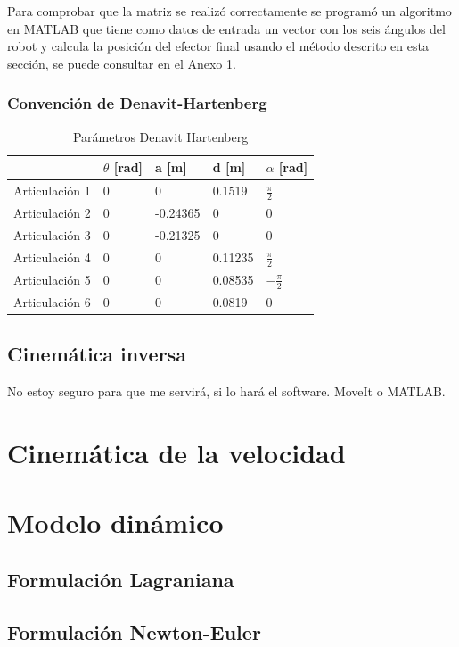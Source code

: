 Para comprobar que la matriz se realizó correctamente se programó un algoritmo en MATLAB que tiene como datos de entrada un vector con los seis ángulos del robot y calcula la posición del efector final usando el método descrito en esta sección, se puede consultar en el Anexo 1.

\subsubsection{Convención de Denavit-Hartenberg}


\begin{table}[h]
\centering
\caption{Parámetros Denavit Hartenberg}
 \label{table:denavithartenberg}
\begin{tabular}{l|l|l|l|l|}
               & $\theta$ [rad] & a [m]    & d [m]   & $\alpha$ [rad]                        \\ 
\hline
Articulación 1 & 0                           & 0        & 0.1519  & $\frac{\pi}{2}$   \\
Articulación 2 & 0                           & -0.24365 & 0       & 0                                                  \\
Articulación 3 & 0                           & -0.21325 & 0       & 0                                                  \\
Articulación 4 & 0                           & 0        & 0.11235 & $\frac{\pi}{2}$   \\
Articulación 5 & 0                           & 0        & 0.08535 & $-\frac{\pi}{2}$  \\
Articulación 6 & 0                           & 0        & 0.0819  & 0                                                 
\end{tabular}
\end{table}

\subsection{Cinemática inversa}
No estoy seguro para que me servirá, si lo hará el software. MoveIt o MATLAB.

\section{Cinemática de la velocidad}


\section{Modelo dinámico}
\subsection{Formulación Lagraniana}
\subsection{Formulación Newton-Euler}